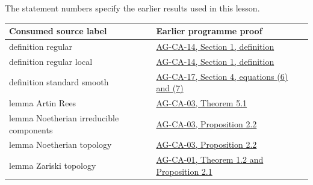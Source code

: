 \documentclass[11pt,a4paper,openany]{report}
\newcounter{none}
\begin{document}
The statement numbers specify the earlier results used in this lesson.

{\def\LTcaptype{none} %
\begin{longtable}[]{@{}
  >{\raggedright\arraybackslash}p{}
  >{\raggedright\arraybackslash}p{}@{}}
\toprule\noalign{}
\begin{minipage}[b]{\linewidth}\raggedright
Consumed source label
\end{minipage} & \begin{minipage}[b]{\linewidth}\raggedright
Earlier programme proof
\end{minipage} \\
\midrule\noalign{}
\endhead
\bottomrule\noalign{}
\endlastfoot
definition regular & \href{https://github.com/KokunoYumeto/open-math-courses/blob/d02d0a3669f42579db037cd44de1d113fdd770a1/docs/courses/AG-CA/src/regular-local-rings.md}{AG-CA-14, Section 1, definition} \\
definition regular local & \href{https://github.com/KokunoYumeto/open-math-courses/blob/d02d0a3669f42579db037cd44de1d113fdd770a1/docs/courses/AG-CA/src/regular-local-rings.md}{AG-CA-14, Section 1, definition} \\
definition standard smooth & \href{https://github.com/KokunoYumeto/open-math-courses/blob/d02d0a3669f42579db037cd44de1d113fdd770a1/docs/courses/AG-CA/src/formally-smooth-unramified-and-etale-ring-maps.md}{AG-CA-17, Section 4, equations (6) and (7)} \\
lemma Artin Rees & \href{https://github.com/KokunoYumeto/open-math-courses/blob/d02d0a3669f42579db037cd44de1d113fdd770a1/docs/courses/AG-CA/src/noetherian-and-artinian-rings.md}{AG-CA-03, Theorem 5.1} \\
lemma Noetherian irreducible components & \href{https://github.com/KokunoYumeto/open-math-courses/blob/d02d0a3669f42579db037cd44de1d113fdd770a1/docs/courses/AG-CA/src/noetherian-and-artinian-rings.md}{AG-CA-03, Proposition 2.2} \\
lemma Noetherian topology & \href{https://github.com/KokunoYumeto/open-math-courses/blob/d02d0a3669f42579db037cd44de1d113fdd770a1/docs/courses/AG-CA/src/noetherian-and-artinian-rings.md}{AG-CA-03, Proposition 2.2} \\
lemma Zariski topology & \href{https://github.com/KokunoYumeto/open-math-courses/blob/d02d0a3669f42579db037cd44de1d113fdd770a1/docs/courses/AG-CA/src/spectra-of-rings.md}{AG-CA-01, Theorem 1.2 and Proposition 2.1} \\

\end{longtable}}
\end{document}
